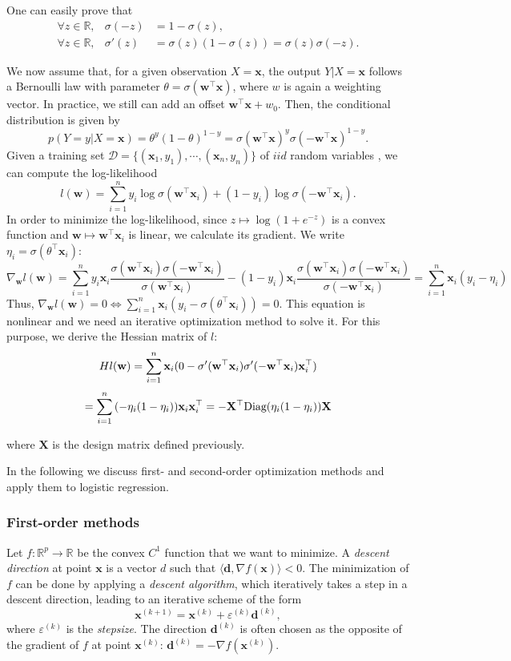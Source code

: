 \documentclass[12pt]{report}	%
\def\ts{\top}
\def\XX{\mathbf{X}}
\def\wb{\mathbf{w}}
\def\xb{\mathbf{x}}
\def\db{\mathbf{d}}
\def\Diag{\text{Diag}}
\begin{document}
One can easily prove that
$$
\begin{array}{lll}
\forall z \in \mathbb{R},& \sigma(-z)&=1-\sigma(z),\\
\forall z \in \mathbb{R},& \sigma ' (z) &= \sigma(z)(1-\sigma(z)) = \sigma(z)\sigma(-z).
\end{array}
$$

We now assume that, for a given observation $X=\xb$, the output $Y{|X=\xb}$ follows a Bernoulli law with parameter $\theta=\sigma({\wb}^{\ts}\xb)$, where $w$ is again a weighting vector. In practice, we still can add an offset ${\wb}^{\ts}\xb+w_0$. Then, the conditional distribution is given by
$$
p(Y=y|X=\xb) = \theta^y(1-\theta)^{1-y} = \sigma({\wb}^{\ts}\xb)^y\sigma(-{\wb}^{\ts}\xb)^{1-y}.
$$
Given a training set $\mathcal{D}=\lbrace (\xb_1,y_1),\cdots ,(\xb_n,y_n)\rbrace$ of $iid$ random variables , we can compute the log-likelihood
$$
l({\wb}) = \sum_{i=1}^n{y_i\log\sigma({\wb}^{\ts}\xb_i)+(1-y_i)\log\sigma(-{\wb}^{\ts}\xb_i)}.
$$
In order to minimize the log-likelihood, since $z\mapsto \log(1+e^{-z})$ is a convex function and $\wb\mapsto {\wb}^{\ts}\xb_i$ is linear, we calculate its gradient. We write $\eta_i = \sigma(\theta^{\ts}\xb_i)$:
$$\nabla_{\wb} l({\wb}) = \sum_{i=1}^n y_i\xb_i \frac{\sigma({\wb}^{\ts}\xb_i)\sigma(-{\wb}^{\ts}\xb_i)}{\sigma({\wb}^{\ts}\xb_i)} -(1-y_i)\xb_i\frac{\sigma({\wb}^{\ts}\xb_i)\sigma(-{\wb}^{\ts}\xb_i)}{\sigma(-{\wb}^{\ts}\xb_i)} = \sum_{i=1}^n \xb_i(y_i-\eta_i)$$
Thus, $\nabla_{\wb} l({\wb}) = 0 \iff \sum_{i=1}^n \xb_i(y_i-\sigma(\theta^{\ts}\xb_i))=0$. This equation is nonlinear and we need an iterative optimization method to solve it. For this purpose, we derive the Hessian matrix of $l$:
$$
Hl({\wb}) = \sum_{i=1}^n {\xb_i(0-\sigma '({\wb}^{\ts}\xb_i)\sigma '(-{\wb}^{\ts}\xb_i)\xb_i^{\ts})}\\
$$
$$
= \sum_{i=1}^n{(-\eta_i(1-\eta_i))\xb_i\xb_i^{\ts}} = -\XX^{\ts}\Diag(\eta_i(1-\eta_i))\XX\\
$$

where $\XX$ is the design matrix defined previously.

In the following we discuss first- and second-order optimization methods and apply them to  logistic regression.

\subsubsection{First-order methods}

Let  $f:\mathbb{R}^p \rightarrow \mathbb{R}$ be the convex $C^{1}$ function that we want to minimize. A \emph{descent direction} at point $\xb$ is a vector $d$ such that $\langle \db, \nabla f (\xb) \rangle < 0$. The minimization of $f$ can be done by applying a \emph{descent algorithm}, which iteratively takes a step in a descent direction, leading to an iterative scheme of the form
$$
 \xb^{(k+1)}=\xb^{(k)}+\varepsilon^{(k)} \db^{(k)},
$$
where $\varepsilon^{(k)}$ is the \emph{stepsize}. The direction $\db^{(k)}$ is often chosen as the opposite of the gradient of $f$ at point $\xb^{(k)}$: $\db^{(k)} = -\nabla f (\xb^{(k)})$.
\end{document}
